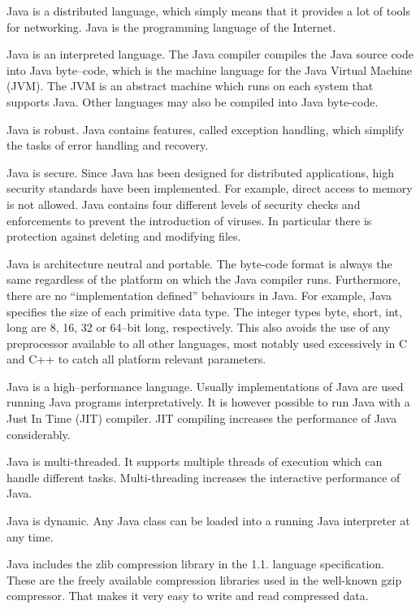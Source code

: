 Java is a distributed language, which simply means that it provides a lot of 
tools for networking. Java is the programming language of the Internet.

Java is an interpreted language. The Java compiler compiles the Java
source code into Java byte--code, which is the machine language for the Java
Virtual Machine (JVM). The JVM is an abstract machine which runs on each system
that supports Java. Other languages may also be compiled into Java byte-code.

Java is robust. Java contains features, called 
exception handling, which simplify the
tasks of error handling and recovery.

Java is secure. Since Java has been designed for distributed applications, 
high security standards have been implemented. For example, direct access to
memory is not allowed. Java contains four different levels of security 
checks and enforcements to prevent the introduction of viruses. 
In particular there is protection against deleting and modifying files.

Java is architecture neutral and portable. The byte-code format is always the 
same regardless of the platform on which the Java compiler runs. Furthermore,
there are no ``implementation defined'' behaviours in Java. For example, Java
specifies the size of each primitive data type. The integer 
types byte, short, int, long are 8, 16, 32 or 64--bit long, respectively.
This also avoids the use of any preprocessor available to all other
languages, most notably used excessively in C and C++ to catch all
platform relevant parameters.

Java is a high--performance language. 
Usually implementations of Java are used running 
Java programs interpretatively. It is however possible to run Java with a 
Just In Time (JIT) compiler. JIT compiling increases the performance of Java 
considerably.

Java is multi-threaded. It supports multiple threads of execution which can 
handle different tasks. Multi-threading increases the interactive performance 
of Java.

Java is dynamic. Any Java class can be loaded into a running Java interpreter 
at any time.

Java includes the zlib compression library in the 1.1. language specification.
These are
the freely available compression libraries used in the well-known
gzip compressor.
That makes it very easy to write and read compressed data. 



